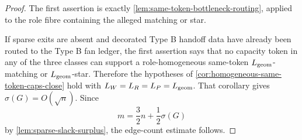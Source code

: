 \documentclass[11pt]{article}
\begin{document}
\begin{proof}
The first assertion is exactly \cref{lem:same-token-bottleneck-routing}, applied
to the role fibre containing the alleged matching or star.

If sparse exits are absent and decorated Type B handoff data have already been
routed to the Type B fan ledger, the first assertion says that no capacity
token in any of the three classes can support a role-homogeneous same-token
\(L_{\rm geom}\)-matching or \(L_{\rm geom}\)-star.  Therefore the hypotheses
of \cref{cor:homogeneous-same-token-caps-close} hold with
\(L_W=L_R=L_P=L_{\rm geom}\).  That corollary gives
\(\sigma(G)=O(\sqrt n)\).  Since
\[
m=\frac32n+\frac12\sigma(G)
\]
by \cref{lem:sparse-slack-surplus}, the edge-count estimate follows.
\end{proof}
\end{document}
